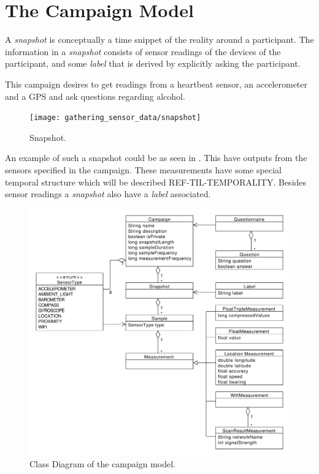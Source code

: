 
\section{The Campaign Model}

A \emph{snapshot} is conceptually a time snippet of the reality around a participant. The information in a \emph{snapshot} consists of sensor readings of the devices of the participant, and some \emph{label} that is derived by explicitly asking the participant. 

This campaign desires to get readings from a heartbeat sensor, an accelerometer and a GPS and ask questions regarding alcohol.

\begin{figure}[!htbp]
    \centering
    \texttt{[image: gathering\_sensor\_data/snapshot]}
    \caption{Snapshot.}
    \label{fig:snapshot_example}
\end{figure}
\FloatBarrier

An example of such a snapshot could be as seen in . This have outputs from the sensors specified in the campaign. These measurements have some special temporal structure which will be described REF-TIL-TEMPORALITY. Besides sensor readings a \emph{snapshot} also have a \emph{label} associated. 






\begin{figure}[!htbp]
    \centering
    \includegraphics[width=\textwidth]{graphic/gathering_sensor_data/model_class_diagram.pdf}
    \caption{Class Diagram of the campaign model.}
    \label{fig:model_class_diagram}
\end{figure}
\FloatBarrier

